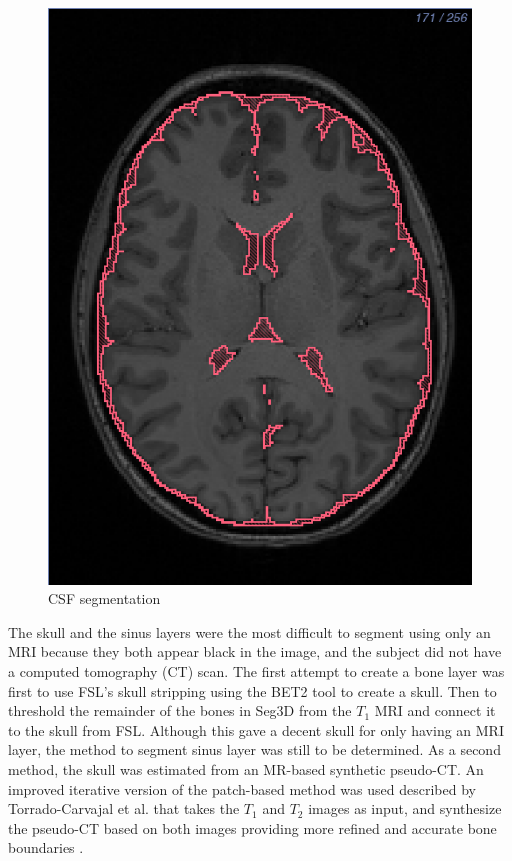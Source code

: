 \begin{figure}[H]
\begin{center}
\includegraphics[width=.49\textwidth]{Figures/CSF_seg}
\caption{CSF segmentation}
\label{fig:csf}
\end{center}
\end{figure}

The skull and the sinus layers were the most difficult to segment using only an MRI because they both appear black in the image, and the subject did not have a computed tomography (CT) scan. The first attempt to create a bone layer was first to use FSL's skull stripping using the BET2 tool to create a skull. Then to threshold the remainder of the bones in Seg3D from the $T_1$ MRI and connect it to the skull from FSL. Although this gave a decent skull for only having an MRI layer, the method to segment sinus layer was still to be determined. As a second method, the skull was estimated from an MR-based synthetic pseudo-CT. An improved iterative version of the patch-based method was used described by Torrado-Carvajal et al. that takes the $T_1$ and $T_2$ images as input, and synthesize the pseudo-CT based on both images providing more refined and accurate bone boundaries \cite{ref:pseudoct}. 

